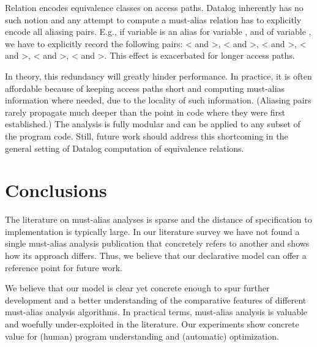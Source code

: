 Relation  encodes equivalence classes on access paths. Datalog inherently has no such notion and any attempt to compute a must-alias relation has to explicitly encode all aliasing pairs. E.g., if variable  is an alias for variable , and  of variable , we have to explicitly record the following pairs: < and >, < and >, < and >, < and >, < and >, < and >. This effect is exacerbated for longer access paths.

In theory, this redundancy will greatly hinder performance. In practice, it is often affordable because of keeping access paths short and computing must-alias information where needed, due to the locality of such information. (Aliasing pairs rarely propagate much deeper than the point in code where they were first established.) The analysis is fully modular and can be applied to any subset of the program code. Still, future work should address this shortcoming in the general setting of Datalog computation of equivalence relations.


\section{Conclusions}

The literature on must-alias analyses is sparse and the distance of specification to implementation is typically large. In our literature survey we have not found a single must-alias analysis publication that concretely refers to another and shows how its approach differs. Thus, we believe that our declarative model can offer a reference point for future work.

We believe that our model is clear yet concrete enough to spur further development and a better understanding of the comparative features of different must-alias analysis algorithms. In practical terms, must-alias analysis is valuable and woefully under-exploited in the literature. Our experiments show concrete value for (human) program understanding and (automatic) optimization.